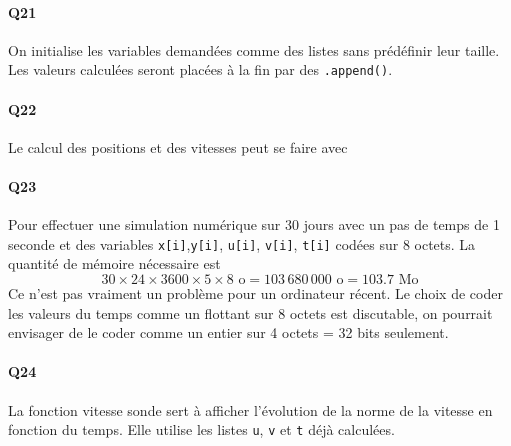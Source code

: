 \paragraph{Q21} On initialise les variables demandées comme des listes sans prédéfinir leur taille. Les valeurs calculées seront placées à la fin par des \texttt{.append()}.


\paragraph{Q22} Le calcul des positions et des vitesses peut se faire avec


\paragraph{Q23} Pour effectuer une simulation numérique sur 30 jours avec un pas de temps de 1 seconde et des variables \texttt{x[i]},\texttt{y[i]}, \texttt{u[i]}, \texttt{v[i]}, \texttt{t[i]} codées sur 8 octets. La quantité de mémoire nécessaire est
\begin{displaymath}
  30\times 24 \times 3600 \times 5 \times 8 \text{ o} 
  = 103\,680\,000 \text{ o}
  = 103.7 \text{ Mo}
\end{displaymath}
Ce n'est pas vraiment un problème pour un ordinateur récent. Le choix de coder les valeurs du temps comme un flottant sur 8 octets est discutable, on pourrait envisager de le coder comme un entier sur 4 octets = 32 bits seulement.

\paragraph{Q24} La fonction vitesse sonde sert à afficher l'évolution de la norme de la vitesse en fonction du temps. Elle utilise les listes \texttt{u}, \texttt{v} et \texttt{t} déjà calculées. 
